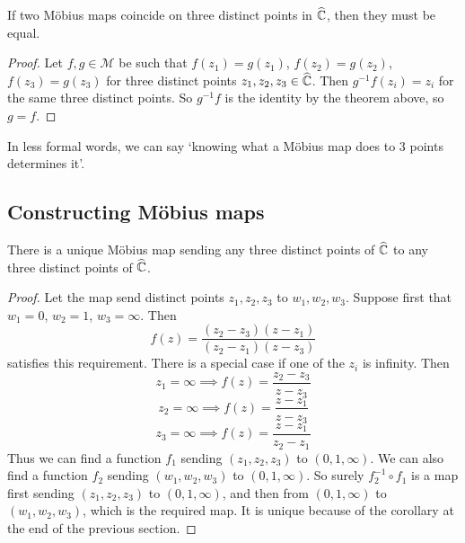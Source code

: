 \begin{corollary}
	If two M\"obius maps coincide on three distinct points in \(\widehat{\mathbb C}\), then they must be equal.
\end{corollary}
\begin{proof}
	Let \(f, g \in \mathcal M\) be such that \(f(z_1) = g(z_1)\), \(f(z_2) = g(z_2)\), \(f(z_3) = g(z_3)\) for three distinct points \(z_1, z_2, z_3 \in \widehat{\mathbb C}\).
	Then \(g^{-1}f(z_i) = z_i\) for the same three distinct points.
	So \(g^{-1}f\) is the identity by the theorem above, so \(g = f\).
\end{proof}
In less formal words, we can say `knowing what a M\"obius map does to 3 points determines it'.

\subsection{Constructing M\"obius maps}
\begin{theorem}
	There is a unique M\"obius map sending any three distinct points of \(\widehat{\mathbb C}\) to any three distinct points of \(\widehat{\mathbb C}\).
\end{theorem}
\begin{proof}
	Let the map send distinct points \(z_1, z_2, z_3\) to \(w_1, w_2, w_3\).
	Suppose first that \(w_1 = 0\), \(w_2 = 1\), \(w_3 = \infty\).
	Then
	\[
		f(z) = \frac{(z_2 - z_3)(z - z_1)}{(z_2 - z_1)(z - z_3)}
	\]
	satisfies this requirement.
	There is a special case if one of the \(z_i\) is infinity.
	Then
	\[
		z_1 = \infty \implies f(z) = \frac{z_2 - z_3}{z - z_3}
	\]
	\[
		z_2 = \infty \implies f(z) = \frac{z - z_1}{z - z_3}
	\]
	\[
		z_3 = \infty \implies f(z) = \frac{z - z_1}{z_2 - z_1}
	\]
	Thus we can find a function \(f_1\) sending \((z_1, z_2, z_3)\) to \((0, 1, \infty)\).
	We can also find a function \(f_2\) sending \((w_1, w_2, w_3)\) to \((0, 1, \infty)\).
	So surely \(f_2^{-1}\circ f_1\) is a map first sending \((z_1, z_2, z_3)\) to \((0, 1, \infty)\), and then from \((0, 1, \infty)\) to \((w_1, w_2, w_3)\), which is the required map.
	It is unique because of the corollary at the end of the previous section.
\end{proof}


